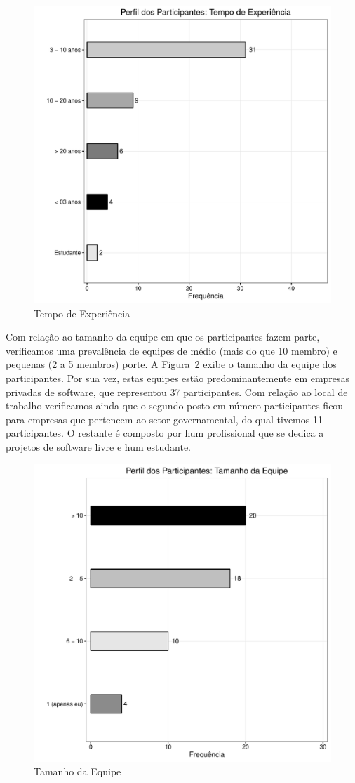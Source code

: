 \begin{figure}[htpb]
	\centering
	\includegraphics[width=0.6\linewidth]{./chapter-estudo-funcionalidades-fgrm/img/grafico_escolha_ferramentas_tempo_experiencia.pdf}
	\caption{Tempo de Experiência}
\label{fig:grafico_escolha_ferramentas_tempo_experiencia}
\end{figure}

Com relação ao tamanho da equipe em que os participantes fazem parte,
verificamos uma prevalência de equipes de médio (mais do que 10 membro) e
pequenas (2 a 5 membros) porte. A
Figura~\ref{fig:grafico_escolha_ferramentas_tamanho_equipe} exibe o tamanho da
equipe dos participantes. Por sua vez, estas equipes estão predominantemente em
empresas privadas de software, que representou 37 participantes. Com relação ao
local de trabalho verificamos ainda que o segundo posto em número
par\-ti\-ci\-pan\-tes ficou para empresas que pertencem ao setor governamental,
do qual tivemos 11 participantes. O restante é composto por hum profissional que
se dedica a projetos de software livre e hum estudante.

\begin{figure}[htpb]
	\centering
	\includegraphics[width=0.6\linewidth]{./chapter-estudo-funcionalidades-fgrm/img/grafico_escolha_ferramentas_tamanho_equipe.pdf}
	\caption{Tamanho da Equipe}
\label{fig:grafico_escolha_ferramentas_tamanho_equipe}
\end{figure}

